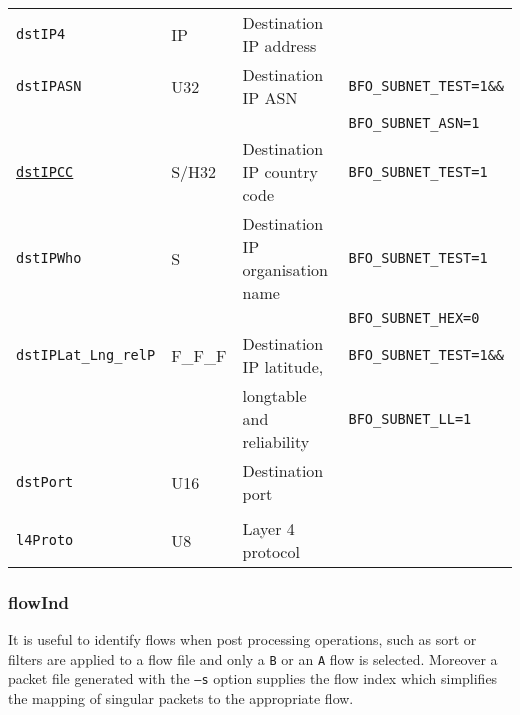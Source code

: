 \documentclass[documentation]{subfiles}
\begin{document}
\begin{longtable}{llll}
    {\tt dstIP4}                     & IP      & Destination IP address           & \\
    {\tt dstIPASN}                   & U32     & Destination IP ASN               & {\tt\small BFO\_SUBNET\_TEST=1\&\&}\\
                                     &         &                                  & {\tt\small BFO\_SUBNET\_ASN=1}\\
    {\tt \hyperref[subnet]{dstIPCC}} & S/H32   & Destination IP country code      & {\tt\small BFO\_SUBNET\_TEST=1}\\
    {\tt dstIPWho}                   & S       & Destination IP organisation name & {\tt\small BFO\_SUBNET\_TEST=1}\\
                                     &         &                                  & {\tt\small BFO\_SUBNET\_HEX=0}\\
    {\tt dstIPLat\_Lng\_relP}        & F\_F\_F & Destination IP latitude,         & {\tt\small BFO\_SUBNET\_TEST=1\&\&}\\
                                     &         & \qquad longtable and reliability & {\tt\small BFO\_SUBNET\_LL=1}\\
    {\tt dstPort}                    & U16     & Destination port                 & \\\\

    {\tt l4Proto}                    & U8      & Layer 4 protocol                 & \\
    \bottomrule
\end{longtable}

\subsubsection{flowInd}\label{flowInd}
It is useful to identify flows when post processing operations, such as sort or
filters are applied to a flow file and only a {\tt B} or an {\tt A} flow is selected. Moreover a packet
file generated with the {\tt --s} option supplies the flow index which simplifies the mapping of singular
packets to the appropriate flow.
\end{document}
